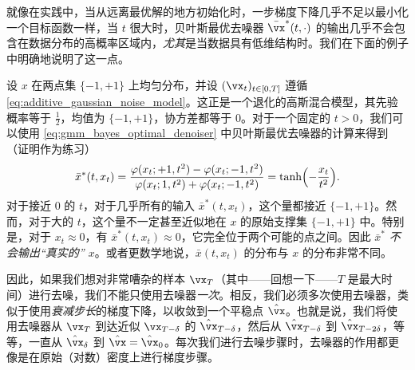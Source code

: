 \documentclass[../../book-main_zh.tex]{subfiles}
\begin{document}
就像在实践中，当从远离最优解的地方初始化时，一步梯度下降几乎不足以最小化一个目标函数一样，当 \(t\) 很大时，贝叶斯最优去噪器 \(\bar{\vx}^{\ast}(t, \cdot)\) 的输出几乎不会包含在数据分布的高概率区域内，\textit{尤其}是当数据具有低维结构时。我们在下面的例子中明确地说明了这一点。
\begin{example}[去噪一个两点混合分布]\label{example:denoising_twopoints}
	设 \(x\) 在两点集 \(\{-1, +1\}\) 上均匀分布，并设 \((\vx_{t})_{t \in [0, T]}\) 遵循 \eqref{eq:additive_gaussian_noise_model}。这正是一个退化的高斯混合模型，其先验概率等于 \(\frac{1}{2}\)，均值为 \(\{-1, +1\}\)，协方差都等于 \(0\)。对于一个固定的 \(t > 0\)，我们可以使用 \eqref{eq:gmm_bayes_optimal_denoiser} 中贝叶斯最优去噪器的计算来得到（证明作为练习）
	\begin{equation}
		\bar{x}^{\ast}(t, x_{t}) = \frac{\phi(x_{t} ; +1, t^{2}) - \phi(x_{t}
		; -1, t^{2})}{\phi(x_{t} ; 1, t^{2}) + \phi(x_{t} ; -1, t^{2})} = \tanh\rp{-\frac{x_{t}}{t^{2}}}.
	\end{equation}
	对于接近 \(0\) 的 \(t\)，对于几乎所有的输入 \(\bar{x}^{\ast}(t, x_{t})\)，这个量都接近 \(\{-1, +1\}\)。然而，对于大的 \(t\)，这个量不一定甚至近似地在 \(x\) 的原始支撑集 \(\{-1, +1\}\) 中。特别是，对于 \(x_{t} \approx 0\)，有 \(\bar{x}^{\ast}(t, x_{t}) \approx 0\)，它完全位于两个可能的点之间。因此 \(\bar{x}^{\ast}\) \textit{不会输出“真实的” \(x\)}。或者更数学地说，\(\bar{x}(t, x_{t})\) 的分布与 \(x\) 的分布非常不同。
\end{example}

因此，如果我们想对非常嘈杂的样本 \(\vx_{T}\)（其中——回想一下——\(T\) 是最大时间）进行去噪，我们不能只使用去噪器\textit{一次}。相反，我们必须多次使用去噪器，类似于使用\textit{衰减步长}的梯度下降，以收敛到一个平稳点 \(\hat{\vx}\)。也就是说，我们将使用去噪器从 \(\vx_{T}\) 到达近似 \(\vx_{T - \delta}\) 的 \(\hat{\vx}_{T - \delta}\)，然后从 \(\hat{\vx}_{T - \delta}\) 到 \(\hat{\vx}_{T - 2\delta}\)，等等，一直从 \(\hat{\vx}_{\delta}\) 到 \(\hat{\vx} = \hat{\vx}_{0}\)。每次我们进行去噪步骤时，去噪器的作用都更像是在原始（对数）密度上进行梯度步骤。
\end{document}

